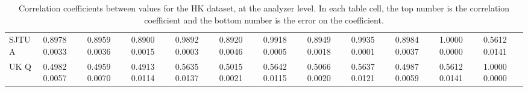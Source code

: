 \begin{landscape}
\begin{table}
\begin{tabularx}{1\linewidth}{@{\extracolsep{\fill}}lXXXXXXXXXXX}
	SJTU A & 0.8978 0.0033 & 0.8959 0.0036 & 0.8900 0.0015 & 0.9892 0.0003 & 0.8920 0.0046 & 0.9918 0.0005 & 0.8949 0.0018 & 0.9935 0.0001 & 0.8984 0.0037 & 1.0000 0.0000 & 0.5612 0.0141  \\
	UK Q   & 0.4982 0.0057 & 0.4959 0.0070 & 0.4913 0.0114 & 0.5635 0.0137 & 0.5015 0.0021 & 0.5642 0.0115 & 0.5066 0.0020 & 0.5637 0.0121 & 0.4987 0.0059 & 0.5612 0.0141 & 1.0000 0.0000  \\
  \bottomrule
\end{tabularx}
\caption[]{Correlation coefficients between \R values for the HK dataset, at the analyzer level. In each table cell, the top number is the correlation coefficient and the bottom number is the error on the coefficient.}
\label{tab:Corrs_HK_analyzer}
\end{table}
\end{landscape}






